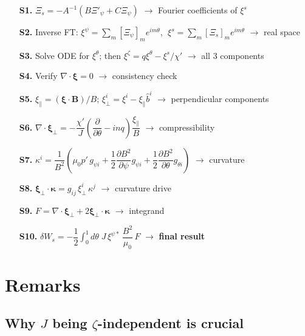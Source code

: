 \documentclass[12pt,a4paper]{article}
\newcommand{\bxi}{\boldsymbol{\xi}}
\begin{document}
\begin{tcolorbox}[colback=blue!10!white, colframe=blue!70!black, title=\textbf{Full pipeline: from $\Xi_\psi$ to $\delta W_s$}, breakable]
\begin{enumerate}
    \item[\textbf{S1.}] $\Xi_s = -A^{-1}(B\Xi'_\psi + C\Xi_\psi)$ \hfill$\to$ Fourier coefficients of $\xi^s$
    \item[\textbf{S2.}] Inverse FT: $\xi^\psi = \sum_m [\Xi_\psi]_m e^{im\theta}$, $\;\xi^s = \sum_m [\Xi_s]_m e^{im\theta}$ \hfill$\to$ real space
    \item[\textbf{S3.}] Solve ODE for $\xi^\theta$; then $\xi^\zeta = q\xi^\theta - \xi^s/\chi'$ \hfill$\to$ all 3 components
    \item[\textbf{S4.}] Verify $\nabla\cdot\boldsymbol{\xi} = 0$ \hfill$\to$ consistency check
    \item[\textbf{S5.}] $\xi_\parallel = (\boldsymbol{\xi}\cdot\mathbf{B})/B$; \quad $\xi^i_\perp = \xi^i - \xi_\parallel\hat{b}^i$ \hfill$\to$ perpendicular components
    \item[\textbf{S6.}] $\nabla\cdot\bxi_\perp = -\dfrac{\chi'}{J}\!\left(\dfrac{\partial}{\partial\theta}-inq\right)\!\dfrac{\xi_\parallel}{B}$ \hfill$\to$ compressibility
    \item[\textbf{S7.}] $\kappa^i = \dfrac{1}{B^2}\!\left(\mu_0 p'\,g_{\psi i} + \dfrac{1}{2}\dfrac{\partial B^2}{\partial\psi}g_{\psi i} + \dfrac{1}{2}\dfrac{\partial B^2}{\partial\theta}g_{\theta i}\right)$ \hfill$\to$ curvature
    \item[\textbf{S8.}] $\bxi_\perp\cdot\bm{\kappa} = g_{ij}\,\xi^i_\perp\,\kappa^j$ \hfill$\to$ curvature drive
    \item[\textbf{S9.}] $F = \nabla\cdot\bxi_\perp + 2\bxi_\perp\cdot\bm{\kappa}$ \hfill$\to$ integrand
    \item[\textbf{S10.}] $\delta W_s = -\dfrac{1}{2}\displaystyle\int_0^1 d\theta\;J\,\xi^{\psi*}\,\dfrac{B^2}{\mu_0}\,F$ \hfill$\to$ \textbf{final result}
\end{enumerate}
\end{tcolorbox}

\section{Remarks}

\subsection*{Why $J$ being $\zeta$-independent is crucial}
\end{document}
